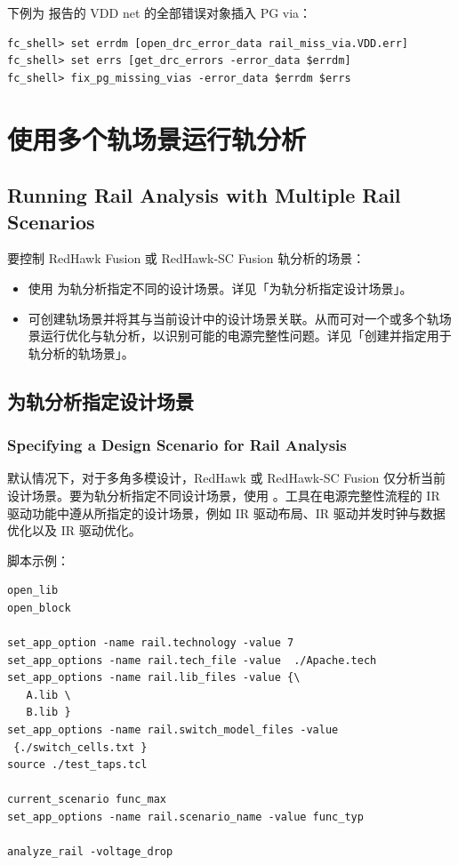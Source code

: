 下例为   报告的 VDD net 的全部错误对象插入 PG via：
\begin{lstlisting}
fc_shell> set errdm [open_drc_error_data rail_miss_via.VDD.err]
fc_shell> set errs [get_drc_errors -error_data $errdm]
fc_shell> fix_pg_missing_vias -error_data $errdm $errs
\end{lstlisting}

\section{使用多个轨场景运行轨分析}
\subsection*{Running Rail Analysis with Multiple Rail Scenarios}

要控制 RedHawk Fusion 或 RedHawk-SC Fusion 轨分析的场景：
\begin{itemize}
  \item 使用  为轨分析指定不同的设计场景。详见「为轨分析指定设计场景」。
  \item 可创建轨场景并将其与当前设计中的设计场景关联。从而可对一个或多个轨场景运行优化与轨分析，以识别可能的电源完整性问题。详见「创建并指定用于轨分析的轨场景」。
\end{itemize}

\subsection{为轨分析指定设计场景}
\subsubsection*{Specifying a Design Scenario for Rail Analysis}

默认情况下，对于多角多模设计，RedHawk 或 RedHawk-SC Fusion 仅分析当前设计场景。要为轨分析指定不同设计场景，使用 。工具在电源完整性流程的 IR 驱动功能中遵从所指定的设计场景，例如 IR 驱动布局、IR 驱动并发时钟与数据优化以及 IR 驱动优化。

脚本示例：
\begin{lstlisting}
open_lib
open_block

set_app_option -name rail.technology -value 7
set_app_options -name rail.tech_file -value  ./Apache.tech
set_app_options -name rail.lib_files -value {\
   A.lib \
   B.lib }
set_app_options -name rail.switch_model_files -value
 {./switch_cells.txt }
source ./test_taps.tcl

current_scenario func_max
set_app_options -name rail.scenario_name -value func_typ

analyze_rail -voltage_drop
\end{lstlisting}

